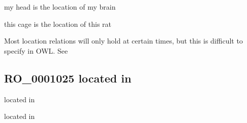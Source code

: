 \documentclass[letterpaper,10pt,english]{sphinxmanual}
\begin{document}
\begin{sphinxShadowBox}

\sphinxAtStartPar
my head is the location of my brain

\sphinxAtStartPar
this cage is the location of this rat
\end{sphinxShadowBox}

\begin{sphinxShadowBox}

\sphinxAtStartPar
Most location relations will only hold at certain times, but this is difficult to specify in OWL. See 
\end{sphinxShadowBox}

\begin{sphinxShadowBox}

\sphinxAtStartPar
{}
\end{sphinxShadowBox}
\begin{quote}

\ignorespaces \end{quote}


\subsection{RO\_0001025 \sphinxhyphen{} located in}
\label{\detokenize{doc-RO_0001025:ro-0001025-located-in}}\label{\detokenize{doc-RO_0001025:index-0}}\label{\detokenize{doc-RO_0001025::doc}}
\begin{sphinxShadowBox}

\sphinxAtStartPar
located in
\end{sphinxShadowBox}

\begin{sphinxShadowBox}

\sphinxAtStartPar
located in
\end{sphinxShadowBox}

\begin{sphinxShadowBox}

\sphinxAtStartPar
{}
\end{sphinxShadowBox}
\end{document}

